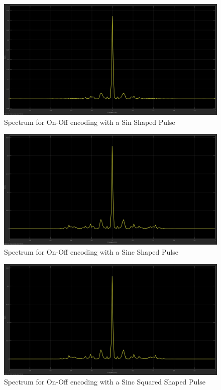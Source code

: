 \documentclass{article}
\begin{document}
\begin{figure}[H]
  \includegraphics[width = \linewidth]{OO_Sin_Spectrum.jpg}
  \caption{Spectrum for On-Off encoding with a Sin Shaped Pulse}
  \label{fig:OO-Sin-Spectrum}
\end{figure}
\begin{figure}[H]
  \includegraphics[width = \linewidth]{OO_Sinc_Spectrum.jpg}
  \caption{Spectrum for On-Off encoding with a Sinc Shaped Pulse}
  \label{fig:OO-Sinc-Spectrum}
\end{figure}
\begin{figure}[H]
  \includegraphics[width = \linewidth]{OO_Squared_Spectrum.jpg}
  \caption{Spectrum for On-Off encoding with a Sinc Squared Shaped Pulse}
  \label{fig:OO-Squared-Spectrum}
\end{figure}
\end{document}
